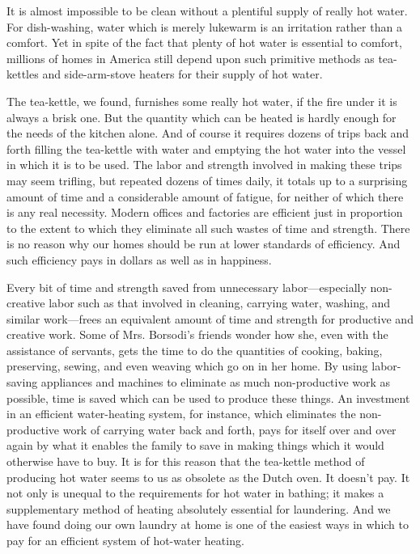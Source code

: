 \documentclass{book}
\begin{document}
It is almost impossible to be clean without a plentiful supply of really hot water. For dish-washing, water which is merely lukewarm is an irritation rather than a comfort. Yet in spite of the fact that plenty of hot water is essential to comfort, millions of homes in America still depend upon such primitive methods as tea-kettles and side-arm-stove heaters for their supply of hot water.

The tea-kettle, we found, furnishes some really hot water, if the fire under it is always a brisk one. But the quantity which can be heated is hardly enough for the needs of the kitchen alone. And of course it requires dozens of trips back and forth filling the tea-kettle with water and emptying the hot water into the vessel in which it is to be used. The labor and strength involved in making these trips may seem trifling, but repeated dozens of times daily, it totals up to a surprising amount of time and a considerable amount of fatigue, for neither of which there is any real necessity. Modern offices and factories are efficient just in proportion to the extent to which they eliminate all such wastes of time and strength. There is no reason why our homes should be run at lower standards of efficiency. And such efficiency pays in dollars as well as in happiness.

Every bit of time and strength saved from unnecessary labor—especially non-creative labor such as that involved in cleaning, carrying water, washing, and similar work—frees an equivalent amount of time and strength for productive and creative work. Some of Mrs. Borsodi’s friends wonder how she, even with the assistance of servants, gets the time to do the quantities of cooking, baking, preserving, sewing, and even weaving which go on in her home. By using labor-saving appliances and machines to eliminate as much non-productive work as possible, time is saved which can be used to produce these things. An investment in an efficient water-heating system, for instance, which eliminates the non-productive work of carrying water back and forth, pays for itself over and over again by what it enables the family to save in making things which it would otherwise have to buy. It is for this reason that the tea-kettle method of producing hot water seems to us as obsolete as the Dutch oven. It doesn’t pay. It not only is unequal to the requirements for hot water in bathing; it makes a supplementary method of heating absolutely essential for laundering. And we have found doing our own laundry at home is one of the easiest ways in which to pay for an efficient system of hot-water heating.
\end{document}
